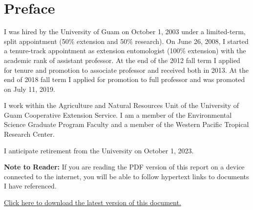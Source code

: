 %
\setcounter{secnumdepth}{0} %
\setcounter{tocdepth}{2}
\tableofcontents{}

\clearpage


\section{Preface}

I was hired by the University of Guam on October 1, 2003 under a limited-term,
split appointment (50\% extension and 50\% research). On June 26,
2008, I started a tenure-track appointment as extension entomologist
(100\% extension) with the academic rank of assistant professor. At
the end of the 2012 fall term I applied for tenure and promotion to associate professor and
received both in 2013. At the end of 2018 fall term I applied for promotion to
full professor and was promoted on July 11, 2019. 

I work within the Agriculture and Natural Resources Unit of the University
of Guam Cooperative Extension Service. I am a member of the
Environmental Science Graduate Program Faculty and a member of the Western
Pacific Tropical Research Center. 

I anticipate retirement from the University on October 1, 2023.

\vspace{0.5in}
\textbf{Note to Reader:}
If you are reading the PDF version of this report on a device connected
to the internet, you will be able to follow hypertext links to documents
I have referenced.

\href{https://aubreymoore.github.io/CFES2020-22/CFES2023.pdf}{Click here to download the latest version of this document.}

